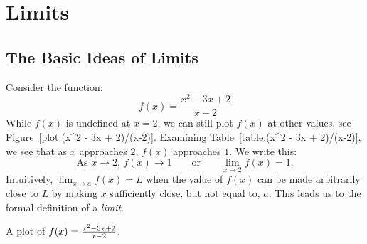 \chapter{Limits}



\section{The Basic Ideas of Limits}{}{}



Consider the function:
\[
f(x) = \frac{x^2 - 3x + 2}{x-2}
\]
While $f(x)$ is undefined at $x=2$, we can still plot $f(x)$ at other
values, see Figure~\ref{plot:(x^2 - 3x + 2)/(x-2)}. Examining
Table~\ref{table:(x^2 - 3x + 2)/(x-2)}, we see that as $x$ approaches
$2$, $f(x)$ approaches $1$. We write this: 
\[
\text{As $x \to 2$, $f(x) \to 1$}\qquad\text{or}\qquad \lim_{x\to 2} f(x) = 1.
\]
Intuitively, $\lim_{x\to a} f(x) = L$ when the value of $f(x)$ can
be made arbitrarily close to $L$ by making $x$ sufficiently close, but
not equal to, $a$.  This leads us to the formal definition of a
\textit{limit}.
\begin{marginfigure}[-5in]
\caption{A plot of $f(x)=\protect\frac{x^2 - 3x + 2}{x-2}$.}
\label{plot:(x^2 - 3x + 2)/(x-2)}
\end{marginfigure}


